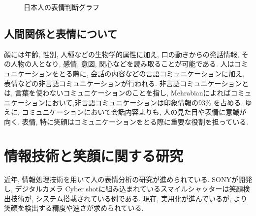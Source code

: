 \begin{figure}[htbp]
    \begin{center}
    \end{center}
    \caption{日本人の表情判断グラフ}
    \label{fig:JapaneseFacialExpression}
\end{figure}

\subsection{人間関係と表情について}
顔には年齢, 性別, 人種などの生物学的属性に加え, 口の動きからの発話情報, その人物の人となり,
感情, 意図, 関心などを読み取ることが可能である\cite{role_facialexpression_in_communication}.
人はコミュニケーションをとる際に, 会話の内容などの言語コミュニケーションに加え,
表情などの非言語コミュニケーションが行われる.
非言語コミュニケーションとは, 言葉を使わないコミュニケーションのことを指し,
Mehrabianによればコミュニケーションにおいて,非言語コミュニケーションは印象情報の93\% を占める\cite{rule_of_Mehrabian}.
ゆえに, コミュニケーションにおいて会話内容よりも, 人の見た目や表情に意識が向く.
表情, 特に笑顔はコミュニケーションをとる際に重要な役割を担っている.


\section{情報技術と笑顔に関する研究}
近年, 情報処理技術を用いて人の表情分析の研究が進められている.
SONYが開発し, デジタルカメラ Cyber shotに組み込まれているスマイルシャッターは笑顔検出技術が,
システム搭載されている例である.
現在, 実用化が進んでいるが, より笑顔を検出する精度や速さが求められている.

